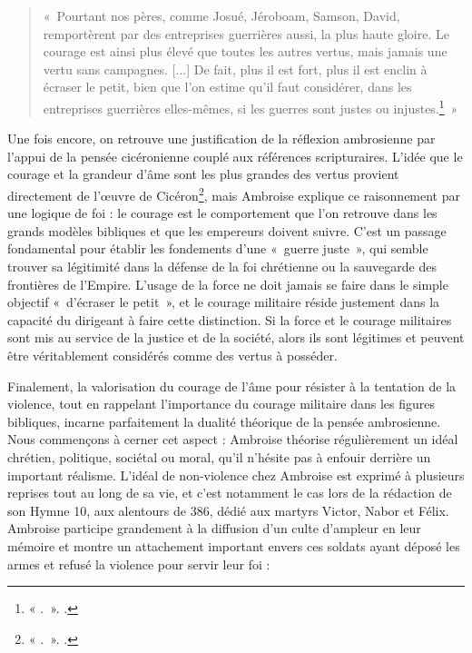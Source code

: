 \begin{quote}
«~Pourtant nos pères, comme Josué, Jéroboam, Samson, David, remportèrent par des entreprises guerrières aussi, la plus haute gloire. Le courage est ainsi plus élevé que toutes les autres vertus, mais jamais une vertu sans campagnes. [...] De fait, plus il est fort, plus il est enclin à écraser le petit, bien que l’on estime qu’il faut considérer, dans les entreprises guerrières elles-mêmes, si les guerres sont justes ou injustes.\footnote{« .~». \cite[\nopp I, 175-176]{ambroise_devoirs_1}.}~»
\end{quote}

\bigskip

Une fois encore, on retrouve une justification de la réflexion ambrosienne par l'appui de la pensée cicéronienne couplé aux références scripturaires. L'idée que le courage et la grandeur d'âme sont les plus grandes des vertus provient directement de l'œuvre de Cicéron\footnote{« .~». \cite[\nopp I, 61]{ciceron_devoirs}.}, mais Ambroise explique ce raisonnement par une logique de foi : le courage est le comportement que l'on retrouve dans les grands modèles bibliques et que les empereurs doivent suivre. C'est un passage fondamental pour établir les fondements d'une «~guerre juste~», qui semble trouver sa légitimité dans la défense de la foi chrétienne ou la sauvegarde des frontières de l'Empire. L'usage de la force ne doit jamais se faire dans le simple objectif «~d'écraser le petit~», et le courage militaire réside justement dans la capacité du dirigeant à faire cette distinction. Si la force et le courage militaires sont mis au service de la justice et de la société, alors ils sont légitimes et peuvent être véritablement considérés comme des vertus à posséder.

\bigskip

Finalement, la valorisation du courage de l'âme pour résister à la tentation de la violence, tout en rappelant l'importance du courage militaire dans les figures bibliques, incarne parfaitement la dualité théorique de la pensée ambrosienne. Nous commençons à cerner cet aspect : Ambroise théorise régulièrement un idéal chrétien, politique, sociétal ou moral, qu'il n'hésite pas à enfouir derrière un important réalisme. L'idéal de non-violence chez Ambroise est exprimé à plusieurs reprises tout au long de sa vie, et c'est notamment le cas lors de la rédaction de son Hymne 10, aux alentours de 386, dédié aux martyrs Victor, Nabor et Félix. Ambroise participe grandement à la diffusion d'un culte d'ampleur en leur mémoire et montre un attachement important envers ces soldats ayant déposé les armes et refusé la violence pour servir leur foi :

